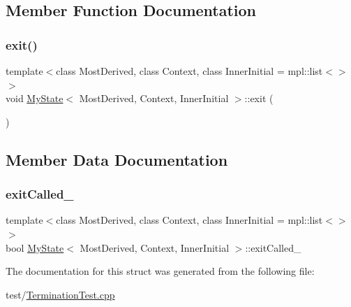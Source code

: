 \subsection{Member Function Documentation}
\mbox{\label{struct_my_state_a7b4389b975201a3773c97e52d16a3a36}} 
\subsubsection{\texorpdfstring{exit()}{exit()}}
{\footnotesize\ttfamily template$<$class Most\+Derived, class Context, class Inner\+Initial = mpl\+::list$<$$>$$>$ \\
void \mbox{\hyperlink{struct_my_state}{My\+State}}$<$ Most\+Derived, Context, Inner\+Initial $>$\+::exit (\begin{DoxyParamCaption}{ }\end{DoxyParamCaption})\hspace{0.3cm}{\ttfamily [inline]}}



\subsection{Member Data Documentation}
\mbox{\label{struct_my_state_a4557684945dea52568cb29e61410c88a}} 
\subsubsection{\texorpdfstring{exit\+Called\+\_\+}{exitCalled\_}}
{\footnotesize\ttfamily template$<$class Most\+Derived, class Context, class Inner\+Initial = mpl\+::list$<$$>$$>$ \\
bool \mbox{\hyperlink{struct_my_state}{My\+State}}$<$ Most\+Derived, Context, Inner\+Initial $>$\+::exit\+Called\+\_\+\hspace{0.3cm}{\ttfamily [private]}}



The documentation for this struct was generated from the following file\+:\begin{DoxyCompactItemize}
\item 
test/\mbox{\hyperlink{_termination_test_8cpp}{Termination\+Test.\+cpp}}\end{DoxyCompactItemize}
